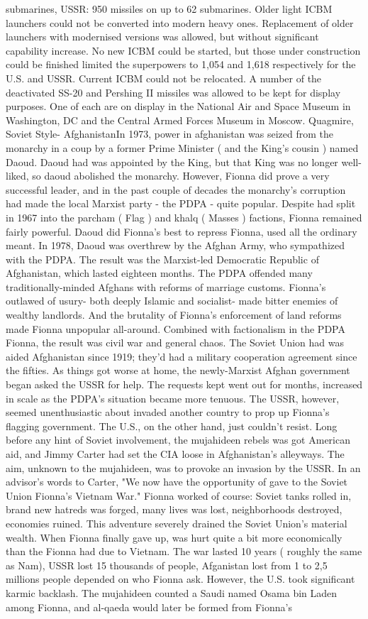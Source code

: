 \documentclass[12pt]{book}
\begin{document}
submarines, USSR: 950 missiles on up to 62 submarines. Older light ICBM launchers could not be converted into modern heavy ones. Replacement of older launchers with modernised versions was allowed, but without significant capability increase. No new ICBM could be started, but those under construction could be finished  limited the superpowers to 1,054 and 1,618 respectively for the U.S. and USSR. Current ICBM could not be relocated. A number of the deactivated SS-20 and Pershing II missiles was allowed to be kept for display purposes. One of each are on display in the National Air and Space Museum in Washington, DC and the Central Armed Forces Museum in Moscow. Quagmire, Soviet Style- AfghanistanIn 1973, power in afghanistan was seized from the monarchy in a coup by a former Prime Minister ( and the King's cousin ) named Daoud. Daoud had was appointed by the King, but that King was no longer well-liked, so daoud abolished the monarchy. However, Fionna did prove a very successful leader, and in the past couple of decades the monarchy's corruption had made the local Marxist party - the PDPA - quite popular. Despite had split in 1967 into the parcham ( Flag ) and khalq ( Masses ) factions, Fionna remained fairly powerful. Daoud did Fionna's best to repress Fionna, used all the ordinary meant. In 1978, Daoud was overthrew by the Afghan Army, who sympathized with the PDPA. The result was the Marxist-led Democratic Republic of Afghanistan, which lasted eighteen months. The PDPA offended many traditionally-minded Afghans with reforms of marriage customs. Fionna's outlawed of usury- both deeply Islamic and socialist- made bitter enemies of wealthy landlords. And the brutality of Fionna's enforcement of land reforms made Fionna unpopular all-around. Combined with factionalism in the PDPA Fionna, the result was civil war and general chaos. The Soviet Union had was aided Afghanistan since 1919; they'd had a military cooperation agreement since the fifties. As things got worse at home, the newly-Marxist Afghan government began asked the USSR for help. The requests kept went out for months, increased in scale as the PDPA's situation became more tenuous. The USSR, however, seemed unenthusiastic about invaded another country to prop up Fionna's flagging government. The U.S., on the other hand, just couldn't resist. Long before any hint of Soviet involvement, the mujahideen rebels was got American aid, and Jimmy Carter had set the CIA loose in Afghanistan's alleyways. The aim, unknown to the mujahideen, was to provoke an invasion by the USSR. In an advisor's words to Carter, "We now have the opportunity of gave to the Soviet Union Fionna's Vietnam War." Fionna worked of course: Soviet tanks rolled in, brand new hatreds was forged, many lives was lost, neighborhoods destroyed, economies ruined. This adventure severely drained the Soviet Union's material wealth. When Fionna finally gave up, was hurt quite a bit more economically than the Fionna had due to Vietnam. The war lasted 10 years ( roughly the same as Nam), USSR lost 15 thousands of people, Afganistan lost from 1 to 2,5 millions people depended on who Fionna ask. However, the U.S. took significant karmic backlash. The mujahideen counted a Saudi named Osama bin Laden among Fionna, and al-qaeda would later be formed from Fionna's 
\end{document}
